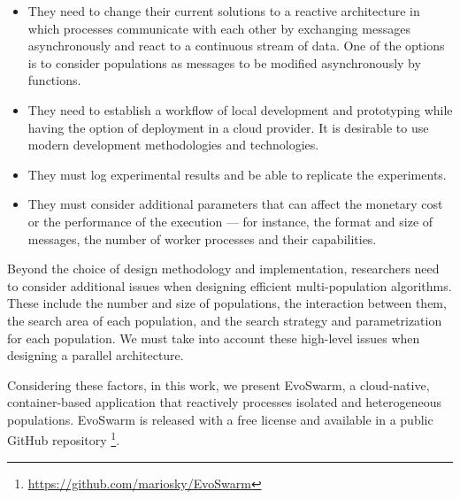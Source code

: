 \documentclass[review]{elsarticle}
\begin{document}
\begin{itemize}
    \item They need to change their current solutions to a reactive architecture in which processes
    communicate with each other by exchanging messages asynchronously and react
    to a continuous stream of data. One of the options is to consider
    populations as messages to be modified asynchronously by functions. 


    \item They need to establish a workflow of local development and prototyping while having the 
    option of deployment in a cloud provider. It is desirable to use modern development methodologies and technologies. 

    \item They must log experimental results and be able to replicate the experiments. 

    \item They must consider additional parameters that can affect the monetary cost or the performance of the
    execution — for instance, the format and size of messages, the number of
    worker processes and their capabilities.  
\end{itemize}

Beyond the choice of design methodology and implementation, researchers need to
consider additional issues \cite{Ma2019} when designing efficient multi-population algorithms. 
These include the number and size of populations,
the interaction between them, the search area of each population, and the search
strategy and parametrization for each population. We must take into account
these high-level issues when designing a parallel architecture.

Considering these factors, in this work, we present EvoSwarm, 
a cloud-native, container-based application that reactively processes
isolated and heterogeneous populations. 
EvoSwarm is released with a free license
and available in a public 
GitHub repository
\footnote{\url{https://github.com/mariosky/EvoSwarm}}.
\end{document}
